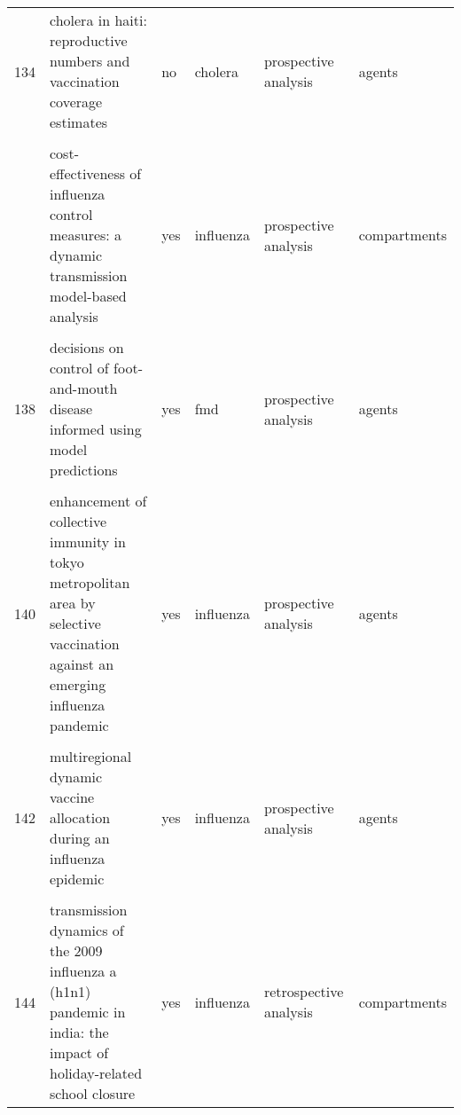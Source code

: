 \documentclass[
]{article}
\begin{document}
\begin{landscape}
\begin{longtable}{l>{\raggedright\arraybackslash}p{3.3cm}l>{\raggedright\arraybackslash}p{3.3cm}>{\raggedright\arraybackslash}p{2cm}l}
134 & cholera in haiti: reproductive numbers and vaccination coverage estimates & no & cholera & prospective analysis & agents\\
\cellcolor{gray!6}{135} & \cellcolor{gray!6}{comparing control strategies against foot-and-mouth disease: will vaccination be cost-effective in denmark?} & \cellcolor{gray!6}{yes} & \cellcolor{gray!6}{fmd} & \cellcolor{gray!6}{prospective analysis} & \cellcolor{gray!6}{agents}\\
\addlinespace
136 & cost-effectiveness of influenza control measures: a dynamic transmission model-based analysis & yes & influenza & prospective analysis & compartments\\
\cellcolor{gray!6}{137} & \cellcolor{gray!6}{cost-effectiveness of workplace closure and travel restriction for mitigating influenza outbreaks: a network-based simulation} & \cellcolor{gray!6}{not applicable} & \cellcolor{gray!6}{influenza} & \cellcolor{gray!6}{prospective analysis} & \cellcolor{gray!6}{agents}\\
138 & decisions on control of foot-and-mouth disease informed using model predictions & yes & fmd & prospective analysis & agents\\
\cellcolor{gray!6}{139} & \cellcolor{gray!6}{dengue in cape verde: vector control and vaccination} & \cellcolor{gray!6}{no} & \cellcolor{gray!6}{dengue} & \cellcolor{gray!6}{prospective analysis} & \cellcolor{gray!6}{compartments}\\
140 & enhancement of collective immunity in tokyo metropolitan area by selective vaccination against an emerging influenza pandemic & yes & influenza & prospective analysis & agents\\
\addlinespace
\cellcolor{gray!6}{141} & \cellcolor{gray!6}{estimated impact of aggressive empirical antiviral treatment in containing an outbreak of pandemic influenza h1n1 in an isolated first nations community} & \cellcolor{gray!6}{yes} & \cellcolor{gray!6}{influenza} & \cellcolor{gray!6}{retrospective analysis} & \cellcolor{gray!6}{compartments}\\
142 & multiregional dynamic vaccine allocation during an influenza epidemic & yes & influenza & prospective analysis & agents\\
\cellcolor{gray!6}{143} & \cellcolor{gray!6}{policies to reduce influenza in the workplace: impact assessments using an agent-based model} & \cellcolor{gray!6}{yes} & \cellcolor{gray!6}{influenza} & \cellcolor{gray!6}{prospective analysis} & \cellcolor{gray!6}{agents}\\
144 & transmission dynamics of the 2009 influenza a (h1n1) pandemic in india: the impact of holiday-related school closure & yes & influenza & retrospective analysis & compartments\\

\end{longtable}
\end{landscape}
\end{document}
